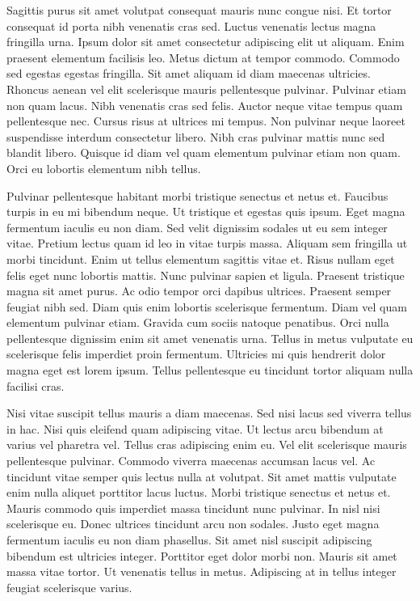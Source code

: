 \documentclass[11pt,a4paper]{article}
\begin{document}
Sagittis purus sit amet volutpat consequat mauris nunc congue nisi. Et tortor consequat id porta nibh venenatis cras sed. Luctus venenatis lectus magna fringilla urna. Ipsum dolor sit amet consectetur adipiscing elit ut aliquam. Enim praesent elementum facilisis leo. Metus dictum at tempor commodo. Commodo sed egestas egestas fringilla. Sit amet aliquam id diam maecenas ultricies. Rhoncus aenean vel elit scelerisque mauris pellentesque pulvinar. Pulvinar etiam non quam lacus. Nibh venenatis cras sed felis. Auctor neque vitae tempus quam pellentesque nec. Cursus risus at ultrices mi tempus. Non pulvinar neque laoreet suspendisse interdum consectetur libero. Nibh cras pulvinar mattis nunc sed blandit libero. Quisque id diam vel quam elementum pulvinar etiam non quam. Orci eu lobortis elementum nibh tellus.

Pulvinar pellentesque habitant morbi tristique senectus et netus et. Faucibus turpis in eu mi bibendum neque. Ut tristique et egestas quis ipsum. Eget magna fermentum iaculis eu non diam. Sed velit dignissim sodales ut eu sem integer vitae. Pretium lectus quam id leo in vitae turpis massa. Aliquam sem fringilla ut morbi tincidunt. Enim ut tellus elementum sagittis vitae et. Risus nullam eget felis eget nunc lobortis mattis. Nunc pulvinar sapien et ligula. Praesent tristique magna sit amet purus. Ac odio tempor orci dapibus ultrices. Praesent semper feugiat nibh sed. Diam quis enim lobortis scelerisque fermentum. Diam vel quam elementum pulvinar etiam. Gravida cum sociis natoque penatibus. Orci nulla pellentesque dignissim enim sit amet venenatis urna. Tellus in metus vulputate eu scelerisque felis imperdiet proin fermentum. Ultricies mi quis hendrerit dolor magna eget est lorem ipsum. Tellus pellentesque eu tincidunt tortor aliquam nulla facilisi cras.

Nisi vitae suscipit tellus mauris a diam maecenas. Sed nisi lacus sed viverra tellus in hac. Nisi quis eleifend quam adipiscing vitae. Ut lectus arcu bibendum at varius vel pharetra vel. Tellus cras adipiscing enim eu. Vel elit scelerisque mauris pellentesque pulvinar. Commodo viverra maecenas accumsan lacus vel. Ac tincidunt vitae semper quis lectus nulla at volutpat. Sit amet mattis vulputate enim nulla aliquet porttitor lacus luctus. Morbi tristique senectus et netus et. Mauris commodo quis imperdiet massa tincidunt nunc pulvinar. In nisl nisi scelerisque eu. Donec ultrices tincidunt arcu non sodales. Justo eget magna fermentum iaculis eu non diam phasellus. Sit amet nisl suscipit adipiscing bibendum est ultricies integer. Porttitor eget dolor morbi non. Mauris sit amet massa vitae tortor. Ut venenatis tellus in metus. Adipiscing at in tellus integer feugiat scelerisque varius.
\end{document}
